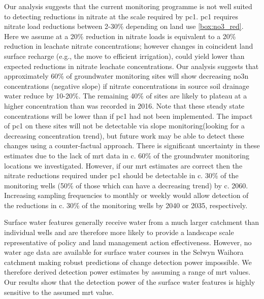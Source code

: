 Our analysis suggests that the current monitoring programme is not well suited to detecting reductions in nitrate at the scale required by \gls{pc1}.
\gls{pc1} requires nitrate load reductions between 2-30\% depending on land use \autoref{box:no3_red}.
Here we assume at a 20\% reduction in nitrate loads is equivalent to a 20\% reduction in leachate nitrate concentrations; however changes in coincident land surface recharge (e.g., the move to efficient irrigation), could yield lower than expected reductions in nitrate leachate concentrations.
Our analysis suggests that approximately 60\% of groundwater monitoring sites will show decreasing \gls{no3n} concentrations (negative slope) if nitrate concentrations in source soil drainage water reduce by 10-20\%.
The remaining 40\% of sites are likely to plateau at a higher concentration than was recorded in 2016.
Note that these steady state concentrations will be lower than if \gls{pc1} had not been implemented.
The impact of \gls{pc1} on these  sites will not be detectable via slope monitoring(looking for a decreasing concentration trend), but future work may be able to detect these changes using a counter-factual approach.
There is significant uncertainty in these estimates due to the lack of \gls{mrt} data in c. 60\% of the groundwater monitoring locations we investigated.
However, if our \gls{mrt} estimates are correct then the nitrate reductions required under \gls{pc1} should be detectable in c. 30\% of the monitoring wells (50\% of those which can have a decreasing trend) by c. 2060.
Increasing sampling frequencies to monthly or weekly would allow detection of the reductions in c. 30\% of the monitoring wells by 2040 or 2035, respectively.

Surface water features generally receive water from a much larger catchment than individual wells and are therefore more likely to provide a landscape scale representative of policy and land management action effectiveness. However, no water age data are available for surface water courses in the Selwyn Waihora catchment making robust predictions of change detection power impossible.
We therefore derived detection power estimates by assuming a range of \gls{mrt} values.
Our results show that the detection power of the surface water features is highly sensitive to the assumed \gls{mrt} value.

